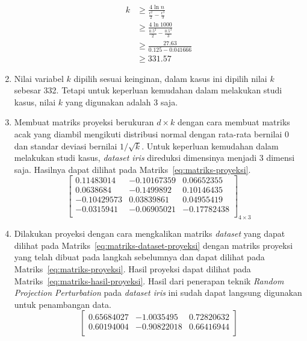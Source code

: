 \begin{enumerate}
    \begin{align*}
        k &\geq \frac{4\ln{n}}{\frac{\epsilon^{2}}{2}-\frac{\epsilon^{3}}{3}} \\
        &\geq \frac{4\ln{1000}}{\frac{0.5^{2}}{2}-\frac{0.5^{3}}{3}} \\
        &\geq \frac{27.63}{0.125-0.041666} \\
        &\geq 331.57
    \end{align*}
    \item Nilai variabel \(k\) dipilih sesuai keinginan, dalam kasus ini dipilih nilai \(k\) sebesar 332. Tetapi untuk keperluan kemudahan dalam melakukan studi kasus, nilai \(k\) yang digunakan adalah 3 saja.
    \item Membuat matriks proyeksi berukuran \(d \times k\) dengan cara membuat matriks acak yang diambil mengikuti distribusi normal dengan rata-rata bernilai 0 dan standar deviasi bernilai \(1/\sqrt{k}\). Untuk keperluan kemudahan dalam melakukan studi kasus, \textit{dataset iris} direduksi dimensinya menjadi 3 dimensi saja. Hasilnya dapat dilihat pada Matriks~\ref{eq:matriks-proyeksi}.
    \begin{equation}\label{eq:matriks-proyeksi}
        \begin{bmatrix}
        0.11483014 &  -0.10167359  &  0.06652355 \\
        0.0638684 &   -0.1499892   &  0.10146435 \\
        -0.10429573 &   0.03839861 &   0.04955419 \\
        -0.0315941  &  -0.06905021  & -0.17782438 \\
        \end{bmatrix}_{4\times 3}
    \end{equation}
    \item Dilakukan proyeksi dengan cara mengkalikan matriks \textit{dataset} yang dapat dilihat pada Matriks~\ref{eq:matriks-dataset-proyeksi} dengan matriks proyeksi yang telah dibuat pada langkah sebelumnya dan dapat dilihat pada Matriks~\ref{eq:matriks-proyeksi}. Hasil proyeksi dapat dilihat pada Matriks~\ref{eq:matriks-hasil-proyeksi}. Hasil dari penerapan teknik \textit{Random Projection Perturbation} pada \textit{dataset iris} ini sudah dapat langsung digunakan untuk penambangan data.
    \begin{equation}\label{eq:matriks-hasil-proyeksi}
        \begin{bmatrix}
        0.65684027 &  -1.0035495   &  0.72820632 \\
        0.60194004 &  -0.90822018  &  0.66416944 \\

\end{bmatrix}
\end{equation}
\end{enumerate}
